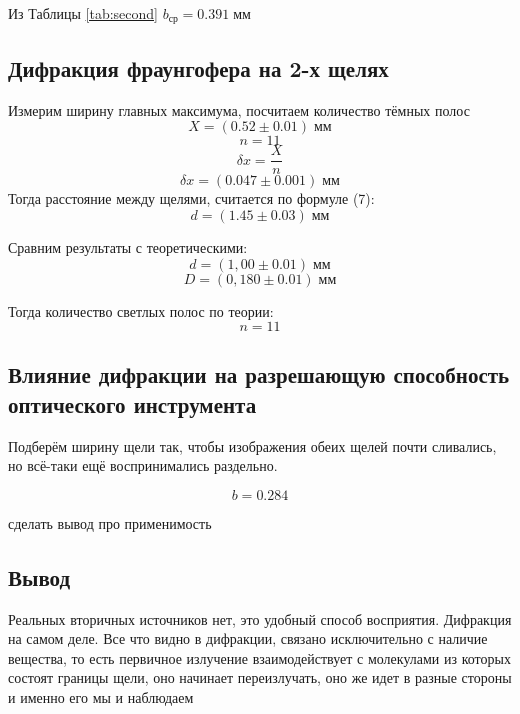\documentclass[a4paper, 12pt]{article}
\begin{document}
Из Таблицы \ref{tab:second} $b_{\text{ср}} = 0.391\; \text{мм}$ 


\subsection{Дифракция фраунгофера на 2-х щелях}

Измерим ширину главных максимума, посчитаем количество тёмных полос
\begin{equation*}
    X = (0.52 \pm 0.01)\; \text{мм}
\end{equation*}
\begin{equation*}
    n = 11
\end{equation*}
\begin{equation*}
    \delta x = \frac{X}{n}
\end{equation*}
\begin{equation*}
    \delta x = (0.047 \pm 0.001)\; \text{мм}
\end{equation*}
Тогда расстояние между щелями, считается по формуле (7):
\begin{equation*}
    d = (1.45 \pm 0.03)\; \text{мм}
\end{equation*}

Сравним результаты с теоретическими:
\begin{equation*}
    d = (1,00 \pm 0.01)\; \text{мм}
\end{equation*}
\begin{equation*}
    D = (0,180 \pm 0.01)\; \text{мм}
\end{equation*}

Тогда количество светлых полос по теории:
\begin{equation*}
    n = 11
\end{equation*}

\subsection{Влияние дифракции на разрешающую способность
оптического инструмента}
Подберём ширину щели так, чтобы изображения обеих щелей почти сливались, но всё-таки ещё воспринимались раздельно.

\begin{equation*}
    b = 0.284
\end{equation*}

сделать вывод про применимость 

\subsection{Вывод} 
Реальных вторичных источников нет, это удобный способ восприятия. Дифракция на самом деле. Все что видно в дифракции, связано исключительно с наличие вещества, то есть первичное излучение взаимодействует с молекулами из которых состоят границы щели, оно начинает переизлучать, оно же идет в разные стороны и именно его мы и наблюдаем
\end{document}
